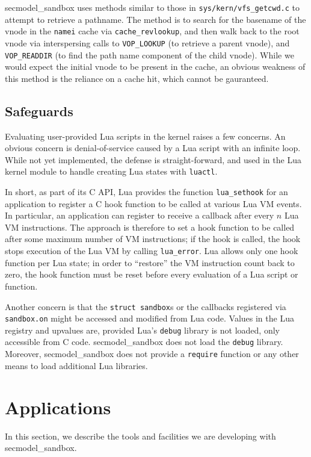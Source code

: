 \documentclass[letterpaper,twocolumn,9pt]{article}
\begin{document}
secmodel\_sandbox uses methods similar to those in
\texttt{sys/kern/vfs\_getcwd.c} to attempt to retrieve a pathname.  The method
is to search for the basename of the vnode in the \texttt{namei} cache via
\texttt{cache\_revlookup}, and then walk back to the root vnode via
interspersing calls to \texttt{VOP\_LOOKUP} (to retrieve a parent vnode),
and \texttt{VOP\_READDIR} (to find the path name component of the child
vnode).   While we would expect the initial vnode to be present in the cache,
an obvious weakness of this method is the reliance on a cache hit, which cannot
be gauranteed.

\subsection{Safeguards}
Evaluating user-provided Lua scripts in the kernel raises a few concerns.  An
obvious concern is denial-of-service caused by a Lua script with an infinite
loop.  While not yet implemented, the defense is straight-forward, and
used in the Lua kernel module to handle creating Lua states with \texttt{luactl}.

In short, as part of its C API, Lua provides the function
\texttt{lua\_sethook} for an application to register a C hook function
to be called at various Lua VM events.  In particular, an application
can register to receive a callback after every $n$ Lua VM instructions.  The
approach is therefore to set a hook function to be called after some maximum
number of VM instructions; if the hook is called, the hook stops execution of the
Lua VM by calling \texttt{lua\_error}.  Lua allows only one hook function per
Lua state; in order to ``restore'' the VM instruction count back to zero, the
hook function must be reset before every evaluation of a Lua script or
function.

Another concern is that the \texttt{struct sandbox}s or the callbacks
registered via \texttt{sandbox.on} might be accessed and modified from Lua
code.  Values in the Lua registry and upvalues are, provided Lua's
\texttt{debug} library is not loaded, only accessible from C code.
secmodel\_sandbox does not load the \texttt{debug} library.  Moreover,
secmodel\_sandbox does not provide a \texttt{require} function or any other
means to load additional Lua libraries.

\section{Applications}
In this section, we describe the tools and facilities we are developing with
secmodel\_sandbox.
\end{document}
